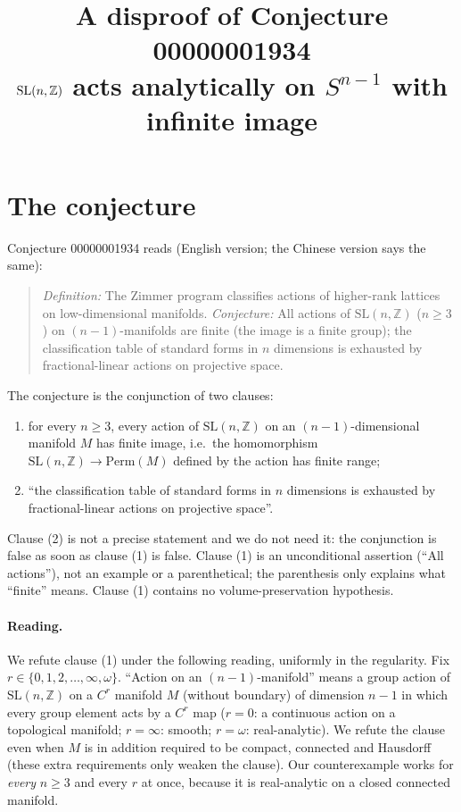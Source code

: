 \documentclass[11pt]{article}
\title{A disproof of Conjecture 00000001934\\[2pt]
\large $\SL(n,\Z)$ acts analytically on $S^{n-1}$ with infinite image}
\date{}
\theoremstyle{definition}
\theoremstyle{remark}
\renewcommand{\_}{\oldus\allowbreak}
\newcommand{\Z}{\mathbb{Z}}
\newcommand{\SL}{\mathrm{SL}}
\begin{document}
\sloppy
\maketitle

\section{The conjecture}

Conjecture 00000001934 reads (English version; the Chinese version says the same):

\begin{quote}
\emph{Definition:} The Zimmer program classifies actions of higher-rank lattices on low-dimensional
manifolds. \emph{Conjecture:} All actions of $\SL(n,\Z)$ ($n \ge 3$) on $(n-1)$-manifolds are finite
(the image is a finite group); the classification table of standard forms in $n$ dimensions is exhausted
by fractional-linear actions on projective space.
\end{quote}

The conjecture is the conjunction of two clauses:
\begin{enumerate}[label=(\arabic*)]
  \item for every $n\ge 3$, every action of $\SL(n,\Z)$ on an $(n-1)$-dimensional manifold $M$ has finite
        image, i.e.\ the homomorphism $\SL(n,\Z)\to\mathrm{Perm}(M)$ defined by the action has finite range;
  \item ``the classification table of standard forms in $n$ dimensions is exhausted by fractional-linear
        actions on projective space''.
\end{enumerate}
Clause (2) is not a precise statement and we do not need it: the conjunction is false as soon as
clause (1) is false. Clause (1) is an unconditional assertion (``All actions''), not an example or a
parenthetical; the parenthesis only explains what ``finite'' means. Clause (1) contains no
volume-preservation hypothesis.

\paragraph{Reading.} We refute clause (1) under the following reading, uniformly in the regularity.
Fix $r \in \{0,1,2,\dots,\infty,\omega\}$. ``Action on an $(n-1)$-manifold'' means a group action of
$\SL(n,\Z)$ on a $C^r$ manifold $M$ (without boundary) of dimension $n-1$ in which every group element
acts by a $C^r$ map ($r=0$: a continuous action on a topological manifold; $r=\infty$: smooth;
$r=\omega$: real-analytic). We refute the clause even when $M$ is in addition required to be compact,
connected and Hausdorff (these extra requirements only weaken the clause). Our counterexample works for
\emph{every} $n\ge 3$ and every $r$ at once, because it is real-analytic on a closed connected manifold.
\end{document}
